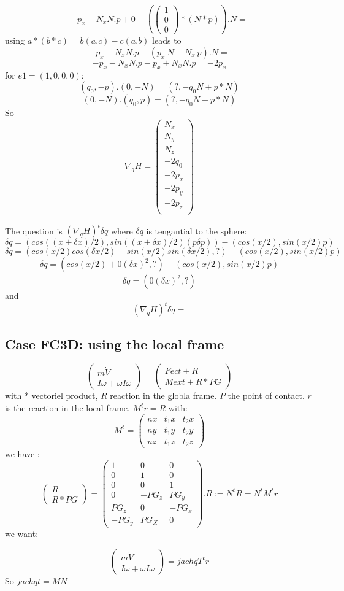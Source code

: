 \[-p_x-N_xN.p+0-(\left(\begin{array}{c}1\\0\\0\end{array}\right)*(N*p)).N=\]
  using $a*(b*c)=b(a.c)-c(a.b)$ leads to
  \[-p_x-N_xN.p-(p_x~N-N_x~p).N=\]
\[-p_x-N_xN.p-p_x+N_xN.p=-2p_x\]
for $e1=(1,0,0,0)$:
\[(q_0,-p).(0,-N)=(?,-q_0N+p*N)\]
\[(0,-N).(q_0,p)=(?,-q_0N-p*N)\]
So
\[\nabla _q H =\left(\begin{array}{c} N_x\\N_y\\N_z\\
-2q_0\\
-2p_x\\
-2p_y\\
-2p_z\\
\end{array}\right)\]

The question is $(\nabla _q H)^t \delta q$ where $\delta q $ is tengantial to the sphere:
\[\delta q=(cos((x+\delta x)/2),sin((x+\delta x)/2)(p \delta p))-(cos(x/2),sin(x/2)p)\]
\[\delta q=(cos(x/2)cos(\delta x /2)-sin(x/2)sin(\delta x /2),?)-(cos(x/2),sin(x/2)p)\]
\[\delta q = (cos(x/2) +0(\delta x)^2,?)-(cos(x/2),sin(x/2)p)\]
\[\delta q = (0(\delta x)^2,?)\]
and
\[(\nabla _q H)^t \delta q = \]

\subsection{Case FC3D: using the local frame}

\[\left(\begin{array}{c}m \dot V\\I \dot \omega + \omega I \omega \end{array}\right)= \left(\begin{array}{c}Fect+R\\Mext + R*PG \end{array}\right)\]
  with * vectoriel product, $R$ reaction in the globla frame. $P$ the point of contact.
  $r$ is the reaction in the local frame.  $M^t r=R$ with:
  \[M^t=\left(\begin{array}{ccc} nx&t_1x&t_2x \\ny&t_1y&t_2y\\nz&t_1z&t_2z \end{array}\right)\]
  we have :
  \[\left(\begin{array}{c}R\\R*PG\end{array}\right)=\left(\begin{array}{ccc} 1&0&0\\0&1&0\\0&0&1\\
      0&-PG_z&PG_y\\PG_z&0&-PG_x\\-PG_y&PG_X&0\end{array}\right).R:=N^tR=N^tM^tr\]
      we want:
      
\[\left(\begin{array}{c}m \dot V\\I \dot \omega + \omega I \omega \end{array}\right)=jachqT^t r\]
So $jachqt=MN$
